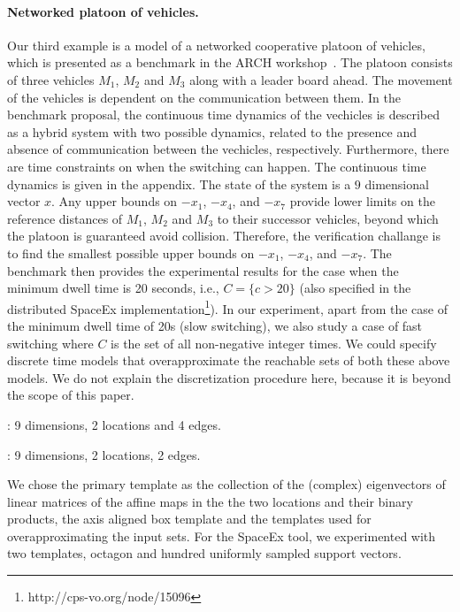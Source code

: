 \paragraph{Networked platoon of vehicles.}
Our third example is a model of a networked cooperative platoon of
vehicles, which is presented as a benchmark in the ARCH
workshop~\cite{makhlouf2014networked}.  The platoon consists of three
vehicles $M_1$, $M_2$ and $M_3$ along with a leader board ahead.  The
movement of the vehicles is dependent on the communication between
them.  In the benchmark proposal, the continuous time dynamics of the
vechicles is described as a hybrid system with two possible dynamics,
related to the presence and absence of communication between the
vechicles, respectively.  Furthermore, there are time constraints on
when the switching can happen.  The continuous time dynamics is
given in the appendix.
The state of the system is a $9$ dimensional vector $x$.
 Any upper bounds on $-x_1$, $-x_4$, and $-x_7$ provide lower limits
 on the reference distances of $M_1$, $M_2$ and $M_3$ to their
 successor vehicles, beyond which the platoon is guaranteed avoid
 collision.  Therefore, the verification challange is to find the
 smallest possible upper bounds on $-x_1$, $-x_4$, and $-x_7$.  The
 benchmark then provides the experimental results for the case when
 the minimum dwell time is 20 seconds, i.e., $C=\{c>20\}$ (also
 specified in the distributed SpaceEx
 implementation\footnote{http://cps-vo.org/node/15096}).  In our
 experiment, apart from the case of the minimum dwell time of 20s
 (slow switching), we also study a case of fast switching where $C$ is
 the set of all non-negative integer times.  We could specify discrete time
 models that overapproximate the reachable sets of both these above
 models.  We do not explain the discretization procedure here, because
 it is beyond the scope of this paper.

: 9 dimensions, 2
locations and 4 edges.

: 9 dimensions, 2
locations, 2 edges.

  We chose the primary template
as the collection of the (complex) eigenvectors of linear matrices of
the affine maps in the the two locations and their binary products,
the axis aligned box template and the templates used for
overapproximating the input sets. For the SpaceEx tool, we
experimented with two templates, octagon and hundred uniformly sampled
support vectors.

